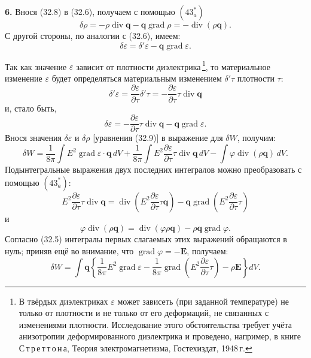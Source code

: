 \documentclass[a4paper,12pt]{article}
\begin{document}
\textbf{6.} Внося (32.8) в (32.6), получаем с помощью $(43^*_a)$
\begin{equation}
    \delta\rho = -\rho\operatorname{div}\mathbf{q}
               - \mathbf{q}\operatorname{grad}\rho
               = -\operatorname{div}(\rho\mathbf{q}).
    \tag{32.9}
\end{equation}
С другой стороны, по аналогии с (32.6), имеем:
$$
    \delta\varepsilon = \delta'\varepsilon - \mathbf{q}\operatorname{grad}\varepsilon.
$$


Так как значение $\varepsilon$ зависит от плотности
диэлектрика\,\footnote{В твёрдых диэлектриках $\varepsilon$ может
зависеть (при заданной температуре) не только от плотности и не только
от его деформаций, не связанных с изменениями плотности. Исследование
этого обстоятельства требует учёта анизотропии деформированного
диэлектрика и проведено, например, в книге
С\,т\,р\,е\,т\,т\,о\,н\,а, Теория электромагнетизма, Гостехиздат,
1948\,г.}, то материальное изменение $\varepsilon$ будет определяться
материальным изменением $\delta'\tau$ плотности $\tau$:
$$
    \delta'\varepsilon
    = \frac{\partial\varepsilon}{\partial\tau}\delta'\tau
    = -\frac{\partial\varepsilon}{\partial\tau}\tau\operatorname{div}\mathbf{q}
$$
и, стало быть,
\begin{equation}
    \delta\varepsilon
    = -\frac{\partial\varepsilon}{\partial\tau}\tau\operatorname{div}\mathbf{q}
    - \mathbf{q}\operatorname{grad}\varepsilon.
    \tag{32.9$'$}
\end{equation}
Внося значения $\delta\varepsilon$ и $\delta\rho$ [уравнения (32.9)]
в выражение для $\delta W$, получим:
$$
    \delta W = \frac{1}{8\pi}\int E^2\operatorname{grad}\varepsilon\cdot\mathbf{q}\,dV
             + \frac{1}{8\pi}\int E^2\frac{\partial\varepsilon}{\partial\tau}
               \tau\operatorname{div}\mathbf{q}\,dV
             - \int \varphi\operatorname{div}(\rho\mathbf{q})\,dV.
$$
Подынтегральные выражения двух последних интегралов можно преобразовать
с помощью $(43^*_a)$:
$$
    E^2\frac{\partial\varepsilon}{\partial\tau}\tau\operatorname{div}\mathbf{q}
    = \operatorname{div}\!\left(E^2\frac{\partial\varepsilon}{\partial\tau}
      \tau\mathbf{q}\right)
    - \mathbf{q}\operatorname{grad}\!\left(E^2\frac{\partial\varepsilon}{\partial\tau}
      \tau\right)
$$
и
$$
    \varphi\operatorname{div}(\rho\mathbf{q})
    = \operatorname{div}(\varphi\rho\mathbf{q})
    - \rho\mathbf{q}\operatorname{grad}\varphi.
$$
Согласно (32.5) интегралы первых слагаемых этих выражений обращаются
в нуль; приняв ещё во внимание, что $\operatorname{grad}\varphi = -\mathbf{E}$,
получаем:
$$
    \delta W = \int \mathbf{q}\left\{
        \frac{1}{8\pi}E^2\operatorname{grad}\varepsilon
        - \frac{1}{8\pi}\operatorname{grad}\!\left(
            E^2\frac{\partial\varepsilon}{\partial\tau}\tau
          \right)
        - \rho\mathbf{E}
    \right\}dV.
$$
\end{document}
